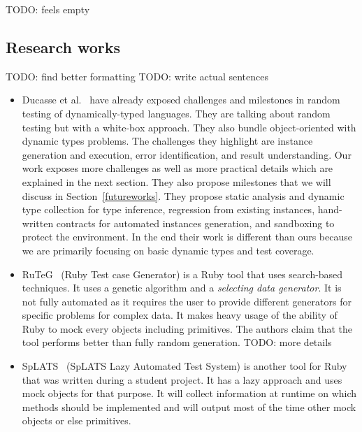 \documentclass{llncs2e/llncs}
\makeatletter
\def\todo#1{{\color{red}TODO\@: #1}}
\makeatother
\begin{document}
\todo{feels empty}

\subsection{Research works}
\label{related_research}

\todo{find better formatting}
\todo{write actual sentences}
\begin{itemize}
  \item Ducasse et al.~\cite{ducasse2011challenges} have already exposed
    challenges and milestones in random testing of dynamically-typed languages.
    They are talking about random testing but with a white-box approach. They
    also bundle object-oriented with dynamic types problems. The challenges they
    highlight are instance generation and execution, error identification, and
    result understanding. Our work exposes more challenges as well as more
    practical details which are explained in the next section. They also propose
    milestones that we will discuss in Section~\ref{futureworks}. They propose
    static analysis and dynamic type collection for type inference, regression
    from existing instances, hand-written contracts for automated instances
    generation, and sandboxing to protect the environment. In the end their work
    is different than ours because we are primarily focusing on basic dynamic
    types and test coverage.

  \item RuTeG~\cite{mairhofer2011search} (Ruby Test case Generator) is a Ruby
    tool that uses search-based techniques. It uses a genetic algorithm and a
    \textit{selecting data generator}. It is not fully automated as it requires
    the user to provide different generators for specific problems for complex
    data. It makes heavy usage of the ability of Ruby to mock every objects
    including primitives. The authors claim that the tool performs better than
    fully random generation.  \todo{more details}

  \item SpLATS~\cite{splats} (SpLATS Lazy Automated Test System) is another tool
    for Ruby that was written during a student project. It has a lazy approach
    and uses mock objects for that purpose. It will collect information at
    runtime on which methods should be implemented and will output most of the
    time other mock objects or else primitives.


\end{itemize}
\end{document}
